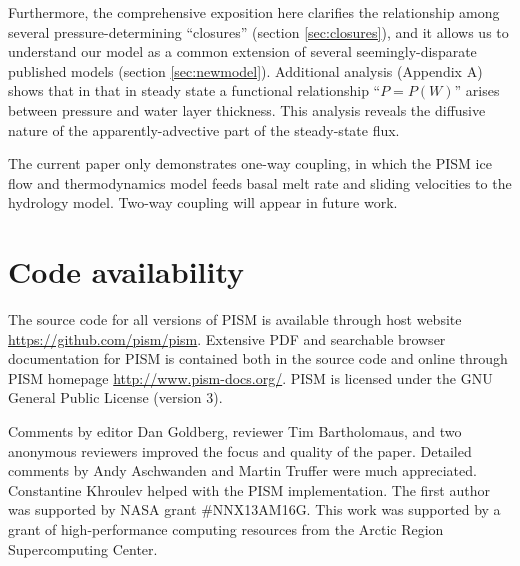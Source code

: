 \documentclass[gmd]{copernicus}   %
\begin{document}
Furthermore, the comprehensive exposition here clarifies the relationship among several pressure-determining ``closures'' (section \ref{sec:closures}), and it allows us to understand our model as a common extension of several seemingly-disparate published models (section \ref{sec:newmodel}).  Additional analysis (Appendix A) shows that in that in steady state a functional relationship ``$P=P(W)$'' arises between pressure and water layer thickness.  This analysis reveals the diffusive nature of the apparently-advective part of the steady-state flux.

The current paper only demonstrates one-way coupling, in which the PISM ice flow and thermodynamics model feeds basal melt rate and sliding velocities to the hydrology model.  Two-way coupling  will appear in future work.


\section{Code availability}  \label{sec:availability}

The source code for all versions of PISM is available through host website \url{https://github.com/pism/pism}.  Extensive PDF and searchable browser documentation for PISM is contained both in the source code and online through PISM homepage \url{http://www.pism-docs.org/}.  PISM is licensed under the GNU General Public License (version 3).


\begin{acknowledgements}
Comments by editor Dan Goldberg, reviewer Tim Bartholomaus, and two anonymous reviewers improved the focus and quality of the paper.  Detailed comments by Andy Aschwanden and Martin Truffer were much appreciated.  Constantine Khroulev helped with the PISM implementation.  The first author was supported by NASA grant \#NNX13AM16G.  This work was supported by a grant of high-performance computing resources from the Arctic Region Supercomputing Center.
\end{acknowledgements}
\end{document}

